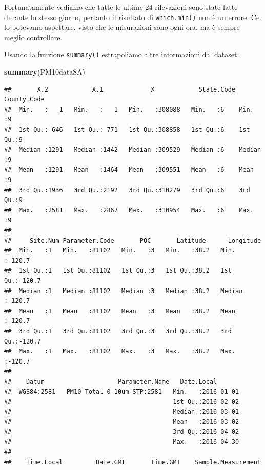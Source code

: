 \documentclass[]{book}
\newenvironment{Shaded}{\begin{snugshade}}{\end{snugshade}}
\newcommand{\KeywordTok}[1]{\textcolor[rgb]{0.13,0.29,0.53}{\textbf{#1}}}
\newcommand{\NormalTok}[1]{#1}
\begin{document}
Fortunatamente vediamo che tutte le ultime 24 rilevazioni sono state fatte durante lo stesso giorno, pertanto il risultato di \texttt{which.min()} non è un errore. Ce lo potevamo aspettare, visto che le misurazioni sono ogni ora, ma è sempre meglio controllare.

Usando la funzione \texttt{summary()} estrapoliamo altre informazioni dal dataset.

\begin{Shaded}
\begin{Highlighting}[]
\KeywordTok{summary}\NormalTok{(PM10dataSA)}
\end{Highlighting}
\end{Shaded}

\begin{verbatim}
##       X.2            X.1             X            State.Code  County.Code
##  Min.   :   1   Min.   :   1   Min.   :308088   Min.   :6    Min.   :9   
##  1st Qu.: 646   1st Qu.: 771   1st Qu.:308858   1st Qu.:6    1st Qu.:9   
##  Median :1291   Median :1442   Median :309529   Median :6    Median :9   
##  Mean   :1291   Mean   :1464   Mean   :309551   Mean   :6    Mean   :9   
##  3rd Qu.:1936   3rd Qu.:2192   3rd Qu.:310279   3rd Qu.:6    3rd Qu.:9   
##  Max.   :2581   Max.   :2867   Max.   :310954   Max.   :6    Max.   :9   
##                                                                          
##     Site.Num Parameter.Code       POC       Latitude      Longitude     
##  Min.   :1   Min.   :81102   Min.   :3   Min.   :38.2   Min.   :-120.7  
##  1st Qu.:1   1st Qu.:81102   1st Qu.:3   1st Qu.:38.2   1st Qu.:-120.7  
##  Median :1   Median :81102   Median :3   Median :38.2   Median :-120.7  
##  Mean   :1   Mean   :81102   Mean   :3   Mean   :38.2   Mean   :-120.7  
##  3rd Qu.:1   3rd Qu.:81102   3rd Qu.:3   3rd Qu.:38.2   3rd Qu.:-120.7  
##  Max.   :1   Max.   :81102   Max.   :3   Max.   :38.2   Max.   :-120.7  
##                                                                         
##    Datum                    Parameter.Name   Date.Local        
##  WGS84:2581   PM10 Total 0-10um STP:2581   Min.   :2016-01-01  
##                                            1st Qu.:2016-02-02  
##                                            Median :2016-03-01  
##                                            Mean   :2016-03-02  
##                                            3rd Qu.:2016-04-02  
##                                            Max.   :2016-04-30  
##                                                                
##    Time.Local         Date.GMT       Time.GMT    Sample.Measurement

\end{verbatim}
\end{document}
